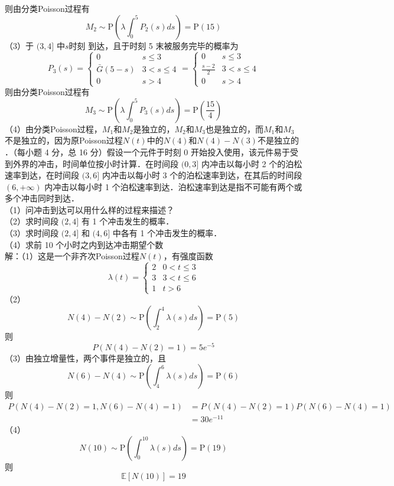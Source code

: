 \documentclass[UTF8,openany]{book}
\begin{document}
则由分类Poisson过程有
\[
M_2 \sim \mathrm{P}\left(\lambda \int_{0}^{5} P_2(s)ds  \right) =\mathrm{P}(15)
\]
（3）于 $(3,4]$ 中$s$时刻 到达，且于时刻 5 末被服务完毕的概率为
\[
P_3(s)=
\begin{cases}
	0  &  s\le 3 \\
	\bar{G}(5-s)  &  3<s\le 4\\
	0 & s>4
\end{cases}
=
\begin{cases}
	0  &  s\le 3 \\
	\frac{s-2}{2}  &  3<s\le 4\\
	0 & s>4
\end{cases}
\]
则由分类Poisson过程有
\[
M_3 \sim \mathrm{P}\left(\lambda \int_{0}^{5} P_3(s)ds  \right) =\mathrm{P}\left(\frac{15}{4} \right) 
\]
（4）由分类Poisson过程，$M_1$和$M_2$是独立的，$M_2$和$M_3$也是独立的，而$M_1$和$M_3$不是独立的，因为原Poisson过程$N(t)$中的$N(4)$和$N(4)-N(3)$不是独立的\\





．（每小题 4 分，总 16 分）假设一个元件于时刻 0 开始投入使用，该元件易于受到外界的冲击，时间单位按小时计算．在时间段 $(0,3]$ 内冲击以每小时 2 个的泊松速率到达，在时间段 $(3,6]$ 内冲击以每小时 3 个的泊松速率到达，在其后的时间段 $(6,+\infty)$ 内冲击以每小时 1 个泊松速率到达．泊松速率到达是指不可能有两个或多个冲击同时到达．\\
（1）问冲击到达可以用什么样的过程来描述？\\
（2）求时间段 $(2,4]$ 有 1 个冲击发生的概率．\\
（3）求时间段 $(2,4]$ 和 $(4,6]$ 中各有 1 个冲击发生的概率．\\
（4）求前 10 个小时之内到达冲击期望个数\\
解：（1）这是一个非齐次Poisson过程$N(t)$，有强度函数
\[
\lambda(t)=
\begin{cases}
	2  &  0<t\le 3 \\
	3  &  3<t\le 6 \\
	1  &  t>6
\end{cases}
\]
（2）
\[
N(4)-N(2)\sim \mathrm{P}\left(\int_{2}^{4}\lambda(s)ds \right)=\mathrm{P}(5) 
\]
则
\[
P(N(4)-N(2)=1)=5e^{-5}
\]
（3）由独立增量性，两个事件是独立的，且
\[
N(6)-N(4)\sim \mathrm{P}\left(\int_{4}^{6}\lambda(s)ds \right)=\mathrm{P}(6) 
\]
则
\begin{align*}
	P(N(4)-N(2)=1,N(6)-N(4)=1) &= P(N(4)-N(2)=1) P(N(6)-N(4)=1)\\
	& =30e^{-11}
\end{align*}
（4）
\[
N(10)\sim \mathrm{P}\left(\int_{0}^{10}\lambda(s)ds \right)=\mathrm{P}(19) 
\]
则
\[
\mathbb{E}[N(10)]=19
\]\\
\end{document}
